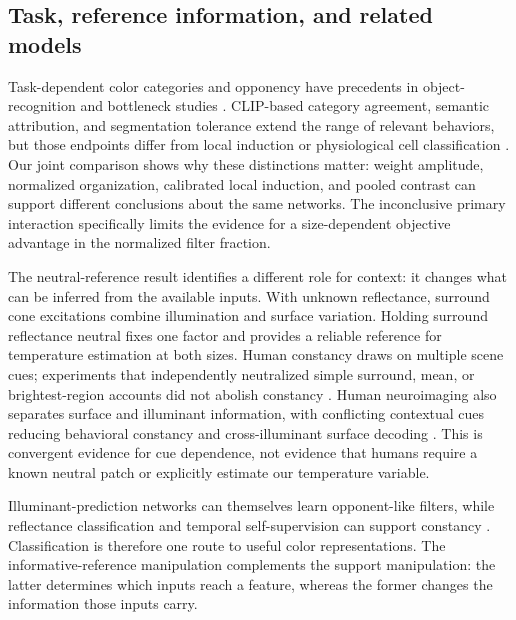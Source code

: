 \documentclass[authoryear,preprint,review,12pt]{elsarticle}
\begin{document}
\subsection{Task, reference information, and related models}
Task-dependent color categories and opponency have precedents in object-recognition and bottleneck studies \citep{devries2022categorization,harris2021opponency}. CLIP-based category agreement, semantic attribution, and segmentation tolerance extend the range of relevant behaviors, but those endpoints differ from local induction or physiological cell classification \citep{akbarinia2025categorical,arias2024clip,hernandezcamara2024alignment}. Our joint comparison shows why these distinctions matter: weight amplitude, normalized organization, calibrated local induction, and pooled contrast can support different conclusions about the same networks. The inconclusive primary interaction specifically limits the evidence for a size-dependent objective advantage in the normalized filter fraction.

The neutral-reference result identifies a different role for context: it changes what can be inferred from the available inputs. With unknown reflectance, surround cone excitations combine illumination and surface variation. Holding surround reflectance neutral fixes one factor and provides a reliable reference for temperature estimation at both sizes. Human constancy draws on multiple scene cues; experiments that independently neutralized simple surround, mean, or brightest-region accounts did not abolish constancy \citep{kraft1999constancy}. Human neuroimaging also separates surface and illuminant information, with conflicting contextual cues reducing behavioral constancy and cross-illuminant surface decoding \citep{bannert2017invariance}. This is convergent evidence for cue dependence, not evidence that humans require a known neutral patch or explicitly estimate our temperature variable.

Illuminant-prediction networks can themselves learn opponent-like filters, while reflectance classification and temporal self-supervision can support constancy \citep{gao2026illuminant,flachot2022deep,ernst2024selfsup,heidari2026human}. Classification is therefore one route to useful color representations. The informative-reference manipulation complements the support manipulation: the latter determines which inputs reach a feature, whereas the former changes the information those inputs carry.
\end{document}
